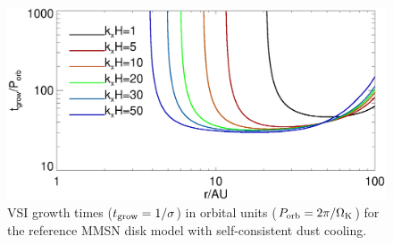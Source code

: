 \begin{figure}
  \includegraphics[width=\linewidth]{figures/eigen_compare_grow.ps}
  \caption{VSI growth times ($t_{\rm grow} = 1/\sigma$) in orbital units ($P_\mathrm{orb} = 2\pi/\Omega_{\rm K}$) for
    the reference MMSN disk model with self-consistent dust cooling. 
    \label{mmsn_overall}}    
\end{figure}
